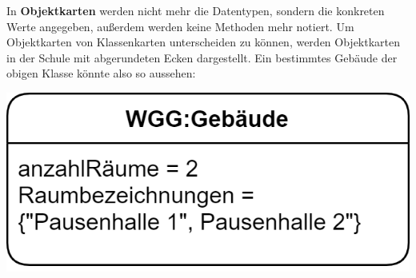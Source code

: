 \documentclass{article}
\begin{document}
In \textbf{Objektkarten} werden nicht mehr die Datentypen, sondern die konkreten Werte angegeben, außerdem werden keine Methoden mehr notiert. Um Objektkarten von Klassenkarten unterscheiden zu können, werden Objektkarten in der Schule mit abgerundeten Ecken dargestellt. Ein bestimmtes Gebäude der obigen Klasse könnte also so aussehen:
\begin{center}
    \includegraphics[scale=0.2]{../media/object.png}
\end{center}
\end{document}
